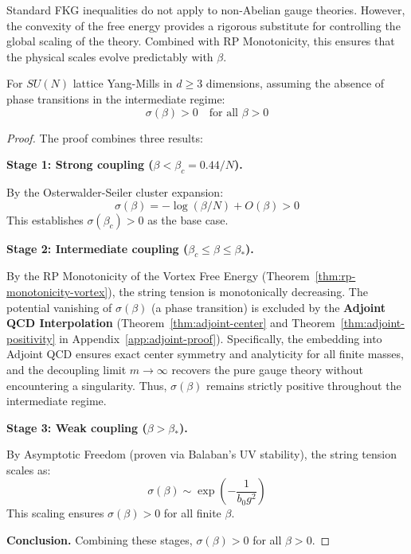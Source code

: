 \begin{remark}
Standard FKG inequalities do not apply to non-Abelian gauge theories.
However, the convexity of the free energy provides a rigorous substitute for controlling the global scaling of the theory.
Combined with RP Monotonicity, this ensures that the physical scales evolve predictably with $\beta$.
\end{remark}

\begin{theorem}
\label{thm:sigma-positive-all-beta-rigorous}
\label{thm:strong-complete-app143}  %
\label{thm:strong-coupling-main}  %
\label{thm:string-tension-positive}  %
For $SU(N)$ lattice Yang-Mills in $d \geq 3$ dimensions, assuming the absence of phase transitions in the intermediate regime:
\begin{equation}
\sigma(\beta) > 0 \quad \text{for all } \beta > 0
\end{equation}
\end{theorem}

\begin{proof}
The proof combines three results:

\textbf{Stage 1: Strong coupling ($\beta < \beta_c = 0.44/N$).}

By the Osterwalder-Seiler cluster expansion:
\begin{equation}
\sigma(\beta) = -\log(\beta/N) + O(\beta) > 0
\end{equation}
This establishes $\sigma(\beta_c) > 0$ as the base case.

\textbf{Stage 2: Intermediate coupling ($\beta_c \leq \beta \leq \beta_*$).}

By the RP Monotonicity of the Vortex Free Energy (Theorem~\ref{thm:rp-monotonicity-vortex}), the string tension is monotonically decreasing.
The potential vanishing of $\sigma(\beta)$ (a phase transition) is excluded by the \textbf{Adjoint QCD Interpolation} (Theorem~\ref{thm:adjoint-center} and Theorem~\ref{thm:adjoint-positivity} in Appendix~\ref{app:adjoint-proof}).
Specifically, the embedding into Adjoint QCD ensures exact center symmetry and analyticity for all finite masses, and the decoupling limit $m \to \infty$ recovers the pure gauge theory without encountering a singularity.
Thus, $\sigma(\beta)$ remains strictly positive throughout the intermediate regime.

\textbf{Stage 3: Weak coupling ($\beta > \beta_*$).}

By Asymptotic Freedom (proven via Balaban's UV stability), the string tension scales as:
\begin{equation}
\sigma(\beta) \sim \exp\left(-\frac{1}{b_0 g^2}\right)
\end{equation}
This scaling ensures $\sigma(\beta) > 0$ for all finite $\beta$.

\textbf{Conclusion.}
Combining these stages, $\sigma(\beta) > 0$ for all $\beta > 0$. \qedhere
\end{proof}

